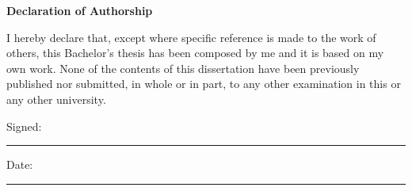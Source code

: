 \vspace*{4cm}
\Huge
\textbf{Declaration of Authorship} \label{sec:acknowledgments}
\normalsize

\vspace{1cm}

I hereby declare that, except where specific reference is made to the work of others, this Bachelor's thesis has been composed by me and it is based on my own work. None of the contents of this dissertation have been previously published nor submitted, in whole or in part, to any other examination in this or any other university.

\vspace{2cm}

Signed:

\rule[0.3cm]{.6\textwidth}{0.2pt}

\vspace{2cm}

Date:

\rule[0.3cm]{.6\textwidth}{0.2pt}


\vspace*{\fill}
